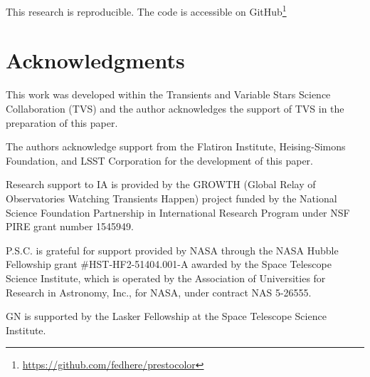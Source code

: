 \documentclass[letterpaper,longauthor,trackchanges,twocolumn,onecolappendix,sort&compress]{aastex62}
\begin{document}
This research is reproducible. The code is accessible on GitHub\footnote{\url{https://github.com/fedhere/prestocolor}}


\section{Acknowledgments}
This work was developed within the Transients and Variable Stars Science Collaboration (TVS) and the author acknowledges the support of TVS in the preparation of this paper. 

\noindent
The authors acknowledge support from the Flatiron Institute,  Heising-Simons Foundation, and LSST Corporation for the development of this paper.

\noindent
Research support to IA is provided by the GROWTH (Global Relay of Observatories Watching Transients Happen) project funded by the National Science Foundation Partnership in International Research Program under NSF PIRE grant number 1545949.

\noindent 
P.S.C. is grateful for support provided by NASA through the NASA Hubble Fellowship grant \#HST-HF2-51404.001-A awarded by the Space Telescope Science Institute, which is operated by the Association of Universities for Research in Astronomy, Inc., for NASA, under contract NAS 5-26555.

\noindent 
GN is supported by the Lasker Fellowship at the Space Telescope Science Institute.
\end{document}
